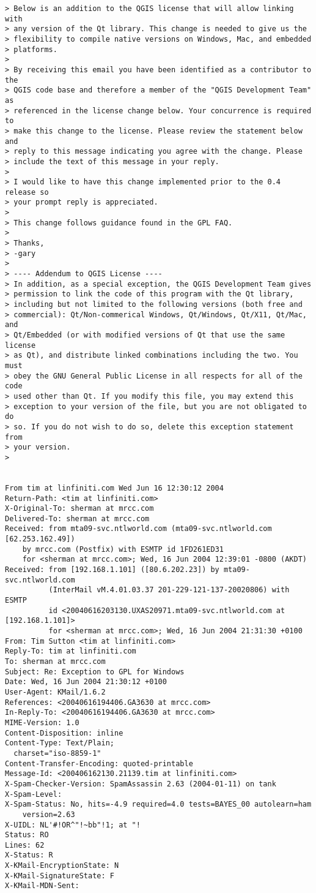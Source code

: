 \begin{small}
\begin{verbatim}
> Below is an addition to the QGIS license that will allow linking with
> any version of the Qt library. This change is needed to give us the
> flexibility to compile native versions on Windows, Mac, and embedded
> platforms.
> 
> By receiving this email you have been identified as a contributor to the
> QGIS code base and therefore a member of the "QGIS Development Team" as
> referenced in the license change below. Your concurrence is required to
> make this change to the license. Please review the statement below and
> reply to this message indicating you agree with the change. Please
> include the text of this message in your reply.
> 
> I would like to have this change implemented prior to the 0.4 release so
> your prompt reply is appreciated.
> 
> This change follows guidance found in the GPL FAQ.
> 
> Thanks,
> -gary
> 
> ---- Addendum to QGIS License ----
> In addition, as a special exception, the QGIS Development Team gives
> permission to link the code of this program with the Qt library,
> including but not limited to the following versions (both free and
> commercial): Qt/Non-commerical Windows, Qt/Windows, Qt/X11, Qt/Mac, and
> Qt/Embedded (or with modified versions of Qt that use the same license
> as Qt), and distribute linked combinations including the two. You must
> obey the GNU General Public License in all respects for all of the code
> used other than Qt. If you modify this file, you may extend this
> exception to your version of the file, but you are not obligated to do
> so. If you do not wish to do so, delete this exception statement from
> your version.
> 


From tim at linfiniti.com Wed Jun 16 12:30:12 2004
Return-Path: <tim at linfiniti.com>
X-Original-To: sherman at mrcc.com
Delivered-To: sherman at mrcc.com
Received: from mta09-svc.ntlworld.com (mta09-svc.ntlworld.com [62.253.162.49])
	by mrcc.com (Postfix) with ESMTP id 1FD261ED31
	for <sherman at mrcc.com>; Wed, 16 Jun 2004 12:39:01 -0800 (AKDT)
Received: from [192.168.1.101] ([80.6.202.23]) by mta09-svc.ntlworld.com
          (InterMail vM.4.01.03.37 201-229-121-137-20020806) with ESMTP
          id <20040616203130.UXAS20971.mta09-svc.ntlworld.com at [192.168.1.101]>
          for <sherman at mrcc.com>; Wed, 16 Jun 2004 21:31:30 +0100
From: Tim Sutton <tim at linfiniti.com>
Reply-To: tim at linfiniti.com
To: sherman at mrcc.com
Subject: Re: Exception to GPL for Windows
Date: Wed, 16 Jun 2004 21:30:12 +0100
User-Agent: KMail/1.6.2
References: <20040616194406.GA3630 at mrcc.com>
In-Reply-To: <20040616194406.GA3630 at mrcc.com>
MIME-Version: 1.0
Content-Disposition: inline
Content-Type: Text/Plain;
  charset="iso-8859-1"
Content-Transfer-Encoding: quoted-printable
Message-Id: <200406162130.21139.tim at linfiniti.com>
X-Spam-Checker-Version: SpamAssassin 2.63 (2004-01-11) on tank
X-Spam-Level: 
X-Spam-Status: No, hits=-4.9 required=4.0 tests=BAYES_00 autolearn=ham 
	version=2.63
X-UIDL: NL'#!OR^"!~bb"!1; at "!
Status: RO
Lines: 62
X-Status: R
X-KMail-EncryptionState: N
X-KMail-SignatureState: F
X-KMail-MDN-Sent:  


\end{verbatim}
\end{small}
